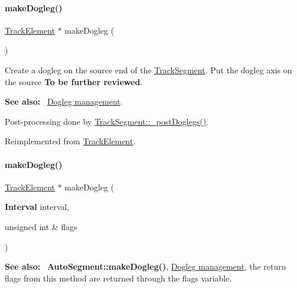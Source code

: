 \paragraph{\texorpdfstring{make\+Dogleg()}{makeDogleg()}\hspace{0.1cm}{\footnotesize\ttfamily [1/2]}}
{\footnotesize\ttfamily \hyperlink{classKite_1_1TrackElement}{Track\+Element} $\ast$ make\+Dogleg (\begin{DoxyParamCaption}{ }\end{DoxyParamCaption})\hspace{0.3cm}{\ttfamily [virtual]}}

Create a dogleg on the source end of the \hyperlink{classKite_1_1TrackSegment}{Track\+Segment}. Put the dogleg axis on the source {\bfseries To be further reviewed}.

{\bfseries See also\+:}~ \hyperlink{classKite_1_1TrackSegment_secDogleg}{Dogleg management}.

Post-\/processing done by \hyperlink{classKite_1_1TrackSegment_a10a45c049d0bd7d01c7eff1c5441c7a2}{Track\+Segment\+::\+\_\+post\+Doglegs()}. 

Reimplemented from \hyperlink{classKite_1_1TrackElement_a7a9637875364e84e6862de0102341715}{Track\+Element}.

\mbox{\label{classKite_1_1TrackSegment_a524f1569b2f2c1a84df2fe47e84e28ed}} 
\paragraph{\texorpdfstring{make\+Dogleg()}{makeDogleg()}\hspace{0.1cm}{\footnotesize\ttfamily [2/2]}}
{\footnotesize\ttfamily \hyperlink{classKite_1_1TrackElement}{Track\+Element} $\ast$ make\+Dogleg (\begin{DoxyParamCaption}\item[{\textbf{ Interval}}]{interval,  }\item[{unsigned int \&}]{flags }\end{DoxyParamCaption})\hspace{0.3cm}{\ttfamily [virtual]}}

{\bfseries See also\+:}~ \textbf{ Auto\+Segment\+::make\+Dogleg()}, \hyperlink{classKite_1_1TrackSegment_secDogleg}{Dogleg management}, the return flags from this method are returned through the {\ttfamily flags} variable.

